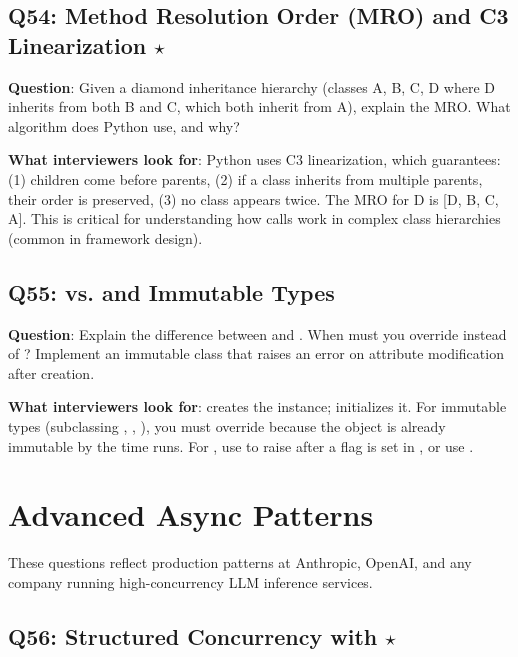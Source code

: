 \subsection{Q54: Method Resolution Order (MRO) and C3 Linearization $\star$}

\textbf{Question}: Given a diamond inheritance hierarchy (classes A, B, C, D where D inherits from both B and C, which both inherit from A), explain the MRO. What algorithm does Python use, and why?

\textbf{What interviewers look for}: Python uses C3 linearization, which guarantees: (1) children come before parents, (2) if a class inherits from multiple parents, their order is preserved, (3) no class appears twice. The MRO for D is [D, B, C, A]. This is critical for understanding how  calls work in complex class hierarchies (common in framework design).

\subsection{Q55:  vs.  and Immutable Types}

\textbf{Question}: Explain the difference between  and . When must you override  instead of ? Implement an immutable  class that raises an error on attribute modification after creation.

\textbf{What interviewers look for}:  creates the instance;  initializes it. For immutable types (subclassing , , ), you must override  because the object is already immutable by the time  runs. For , use  to raise  after a flag is set in , or use .


\section{Advanced Async Patterns}

These questions reflect production patterns at Anthropic, OpenAI, and any company running high-concurrency LLM inference services.

\subsection{Q56: Structured Concurrency with  $\star$}

